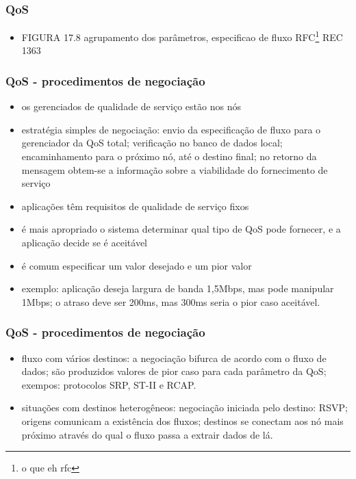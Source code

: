\documentclass[]{beamer}
\begin{document}
\begin{frame}
  \frametitle{QoS}
\begin{itemize}
  \item FIGURA 17.8 agrupamento dos parâmetros, especificao de 
fluxo RFC\footnote{o que eh rfc} REC 1363
\end{itemize}
\end{frame}

\begin{frame}
  \frametitle{QoS - procedimentos de negociação}
\begin{itemize}
  \item os gerenciados de qualidade de serviço estão nos nós
  \item estratégia simples de negociação: envio da especificação de fluxo para o gerenciador
da QoS total; verificação no banco de dados local; encaminhamento para o próximo nó, até
 o destino final; no retorno da mensagem obtem-se a informação sobre a 
viabilidade do fornecimento de serviço
  \item aplicações têm requisitos de qualidade de serviço fixos
  \item é mais apropriado o sistema determinar qual tipo de QoS pode fornecer, e a aplicação
decide se é aceitável
  \item é comum especificar um valor desejado e um pior valor
  \item exemplo: aplicação deseja largura de banda 1,5Mbps, mas pode manipular 1Mbps; o atraso
deve ser 200ms, mas 300ms seria o pior caso aceitável.
\end{itemize}
\end{frame}

\begin{frame}
  \frametitle{QoS - procedimentos de negociação}
\begin{itemize}
  \item fluxo com vários destinos: a negociação bifurca de acordo
com o fluxo de dados; são produzidos valores de pior caso para cada parâmetro da QoS;
exempos: protocolos SRP, ST-II e RCAP.
  \item situações com destinos heterogêneos: negociação iniciada pelo destino: 
RSVP; origens comunicam a existência
dos fluxos; destinos se conectam aos nó mais próximo através do qual o fluxo passa a extrair
dados de lá.
\end{itemize}
\end{frame}
\end{document}
